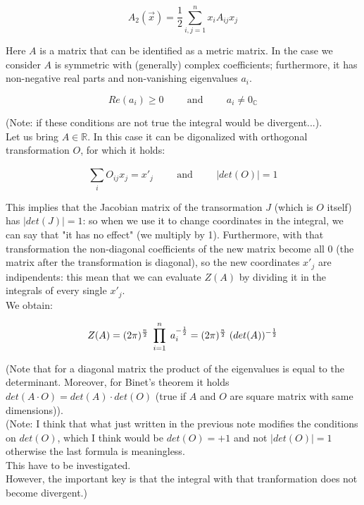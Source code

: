\documentclass[12pt, english, a4paper]{book}
\begin{document}
\begin{equation}
A_2(\vec{x}) = \frac{1}{2} \sum\limits_{i,j = 1}^{n} x_i A_{ij} x_j
\end{equation}

Here $A$ is a matrix that can be identified as a metric matrix.
In the case we consider $A$ is symmetric with (generally) complex coefficients; furthermore, it has non-negative real parts and non-vanishing eigenvalues $a_i$.

$$ Re(a_i) \geq 0 \hspace{1cm} \mathrm{and} \hspace{1cm}  a_i \neq 0_{\mathbb{C}} $$

(Note: if these conditions are not true the integral would be divergent...).\\

Let us bring $A \in \mathbb{R}$. In this case it can be digonalized with orthogonal transformation $O$, for which it holds:

$$ \sum\limits_{i}^{} O_{ij} x_j = x'_j \hspace{1cm} \mathrm{and} \hspace{1cm} |det(O)| = 1 $$

This implies that the Jacobian matrix of the transormation $J$ (which is $O$ itself) has $|det(J)| = 1$: so when we use it to change coordinates in the integral, we can say that "it has no effect" (we multiply by 1).
Furthermore, with that transformation the non-diagonal coefficients of the new matrix become all 0 (the matrix after the transformation is diagonal), so the new coordinates $x'_j$ are indipendents: this mean that we can evaluate $Z(A)$ by dividing it in the integrals of every single $x'_j$.\\
We obtain:

\begin{equation}
Z(A) = (2\pi)^{ \frac{n}{2} } \hspace{1mm} \prod\limits_{i=1}^{n} \hspace{1mm} a_i^{ -\frac{1}{2} } = (2\pi)^{ \frac{n}{2} } \hspace{1mm} (det(A))^{ -\frac{1}{2} }
\end{equation}

(Note that for a diagonal matrix the product of the eigenvalues is equal to the determinant. Moreover, for Binet's theorem it holds $det(A \cdot O) = det(A) \cdot det(O)$ (true if $A$ and $O$ are square matrix with same dimensions)).\\
(Note: I think that what just written in the previous note modifies the conditions on $det(O)$, which I think would be $det(O) = +1$ and not $|det(O)| = 1 $ otherwise the last formula is meaningless.\\
This have to be investigated.\\
However, the important key is that the integral with that tranformation does not become divergent.)
\end{document}
